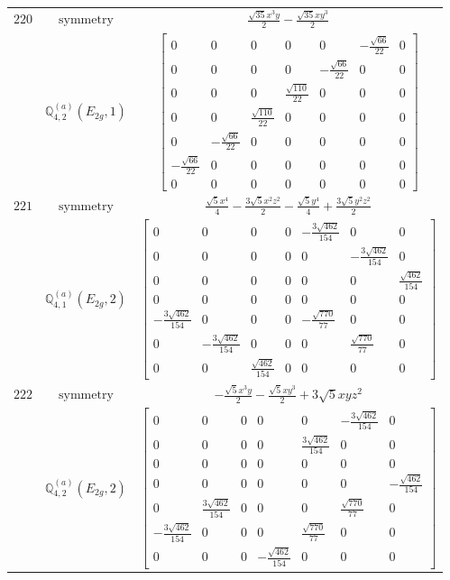 \documentclass[fleqn,8pt,landscape]{jsarticle}
\begin{document}
\begin{longtable}{ccc}
$ 220 $ & $ \text{symmetry} $ & $ \frac{\sqrt{35} x^{3} y}{2} - \frac{\sqrt{35} x y^{3}}{2} $ \\
$  $ & $ \mathbb{Q}_{4,2}^{(a)}(E_{2g},1) $ & $ \begin{bmatrix} 0 & 0 & 0 & 0 & 0 & - \frac{\sqrt{66}}{22} & 0 \\ 0 & 0 & 0 & 0 & - \frac{\sqrt{66}}{22} & 0 & 0 \\ 0 & 0 & 0 & \frac{\sqrt{110}}{22} & 0 & 0 & 0 \\ 0 & 0 & \frac{\sqrt{110}}{22} & 0 & 0 & 0 & 0 \\ 0 & - \frac{\sqrt{66}}{22} & 0 & 0 & 0 & 0 & 0 \\ - \frac{\sqrt{66}}{22} & 0 & 0 & 0 & 0 & 0 & 0 \\ 0 & 0 & 0 & 0 & 0 & 0 & 0 \end{bmatrix} $ \\ \hline
$ 221 $ & $ \text{symmetry} $ & $ \frac{\sqrt{5} x^{4}}{4} - \frac{3 \sqrt{5} x^{2} z^{2}}{2} - \frac{\sqrt{5} y^{4}}{4} + \frac{3 \sqrt{5} y^{2} z^{2}}{2} $ \\
$  $ & $ \mathbb{Q}_{4,1}^{(a)}(E_{2g},2) $ & $ \begin{bmatrix} 0 & 0 & 0 & 0 & - \frac{3 \sqrt{462}}{154} & 0 & 0 \\ 0 & 0 & 0 & 0 & 0 & - \frac{3 \sqrt{462}}{154} & 0 \\ 0 & 0 & 0 & 0 & 0 & 0 & \frac{\sqrt{462}}{154} \\ 0 & 0 & 0 & 0 & 0 & 0 & 0 \\ - \frac{3 \sqrt{462}}{154} & 0 & 0 & 0 & - \frac{\sqrt{770}}{77} & 0 & 0 \\ 0 & - \frac{3 \sqrt{462}}{154} & 0 & 0 & 0 & \frac{\sqrt{770}}{77} & 0 \\ 0 & 0 & \frac{\sqrt{462}}{154} & 0 & 0 & 0 & 0 \end{bmatrix} $ \\ \hline
$ 222 $ & $ \text{symmetry} $ & $ - \frac{\sqrt{5} x^{3} y}{2} - \frac{\sqrt{5} x y^{3}}{2} + 3 \sqrt{5} x y z^{2} $ \\
$  $ & $ \mathbb{Q}_{4,2}^{(a)}(E_{2g},2) $ & $ \begin{bmatrix} 0 & 0 & 0 & 0 & 0 & - \frac{3 \sqrt{462}}{154} & 0 \\ 0 & 0 & 0 & 0 & \frac{3 \sqrt{462}}{154} & 0 & 0 \\ 0 & 0 & 0 & 0 & 0 & 0 & 0 \\ 0 & 0 & 0 & 0 & 0 & 0 & - \frac{\sqrt{462}}{154} \\ 0 & \frac{3 \sqrt{462}}{154} & 0 & 0 & 0 & \frac{\sqrt{770}}{77} & 0 \\ - \frac{3 \sqrt{462}}{154} & 0 & 0 & 0 & \frac{\sqrt{770}}{77} & 0 & 0 \\ 0 & 0 & 0 & - \frac{\sqrt{462}}{154} & 0 & 0 & 0 \end{bmatrix} $ \\ \hline

\end{longtable}
\end{document}
